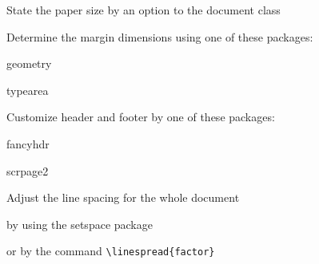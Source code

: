 \documentclass{article}
\begin{document}
\begin{compactenum}
  \item State the paper size by an option to the document class
  \item Determine the margin dimensions using one of these packages:
  \begin{compactitem}
    \item geometry
    \item typearea
  \end{compactitem}
  \item Customize header and footer by one of these packages:
  \begin{compactitem}
    \item fancyhdr
    \item scrpage2
  \end{compactitem}
  \item Adjust the line spacing for the whole document
  \begin{compactitem}
    \item by using the setspace package
    \item or by the command \verb|\linespread{factor}|
  \end{compactitem}
\end{compactenum}
\end{document}

